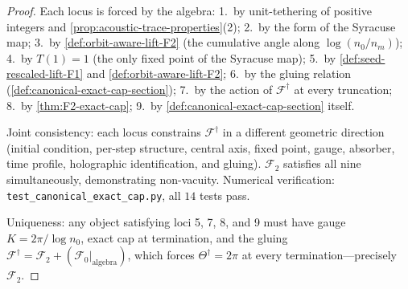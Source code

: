 \documentclass[11pt,a4paper]{article}
\theoremstyle{plain}
\theoremstyle{definition}
\theoremstyle{remark}
\numberwithin{equation}{section}
\begin{document}
\begin{proof}
Each locus is forced by the algebra: 1.\ by unit-tethering of
positive integers and \cref{prop:acoustic-trace-properties}(2); 2.\
by the form of the Syracuse map; 3.\ by
\cref{def:orbit-aware-lift-F2} (the cumulative angle along
$\log(n_0/n_m)$); 4.\ by $T(1)=1$ (the only fixed point of the
Syracuse map); 5.\ by \cref{def:seed-rescaled-lift-F1} and
\cref{def:orbit-aware-lift-F2}; 6.\ by the gluing relation
(\cref{def:canonical-exact-cap-section}); 7.\ by the action of
$\mathcal{F}^{\dagger}$ at every truncation; 8.\ by
\cref{thm:F2-exact-cap}; 9.\ by
\cref{def:canonical-exact-cap-section} itself.

Joint consistency: each locus constrains
$\mathcal{F}^{\dagger}$ in a different geometric direction (initial
condition, per-step structure, central axis, fixed point, gauge,
absorber, time profile, holographic identification, and gluing).
$\mathcal{F}_2$ satisfies all nine simultaneously, demonstrating
non-vacuity.  Numerical verification:
\texttt{test\_canonical\_exact\_cap.py}, all $14$ tests pass.

Uniqueness: any object satisfying loci 5, 7, 8, and 9 must have
gauge $K=2\pi/\log n_0$, exact cap at termination, and the gluing
$\mathcal{F}^{\dagger}=\mathcal{F}_2+(\mathcal{F}_0|_{\mathrm{algebra}})$, which
forces $\Theta^{\dagger}=2\pi$ at every termination---precisely
$\mathcal{F}_2$.
\end{proof}
\end{document}
